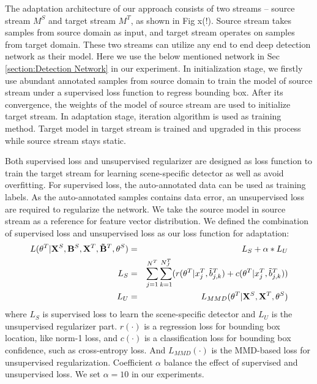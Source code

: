 \documentclass[runningheads]{llncs}
\begin{document}
The adaptation architecture of our approach consists of two streams -- source stream $M^{S}$ and target stream $M^{T}$, as shown in Fig x(!). Source stream takes samples from source domain as input, and target stream operates on samples from target domain. These two streams can utilize any end to end deep detection network as their model. Here we use the below mentioned network in Sec \ref{section:Detection Network} in our experiment. In initialization stage, we firstly use abundant annotated samples from source domain to train the model of source stream under a supervised loss function to regress bounding box. After its convergence, the weights of the model of source stream are used to initialize target stream. In adaptation stage, iteration algorithm is used as training method. Target model in target stream is trained and upgraded in this process while source stream stays static.

Both supervised loss and unsupervised regularizer are designed as loss function to train the target stream for learning scene-specific detector as well as avoid overfitting. For supervised loss, the auto-annotated data can be used as training labels. As the auto-annotated samples contains data error, an unsupervised loss are required to regularize the network. We take the source model in source stream as a reference for feature vector distribution. We defined the combination of supervised loss and unsupervised loss as our loss function for adaptation:
\begin{eqnarray}
  L(\theta^{T}|{\bf X}^{S},{\bf B}^{S},{\bf X}^{T},{\bf \tilde{B}}^{T},\theta^{S}) &=& L_{S} + \alpha * L_{U} \\
  L_{S} &=&  \sum^{N^{T}}_{j=1}{\sum^{N^{T}_{J}}_{k=1}( r(\theta^{T}|x^{T}_{j},\tilde{b}^{T}_{j,k})+c(\theta^{T}|x^{T}_{j},\tilde{b}^{T}_{j,k}) )} \\
  L_{U} &=& L_{MMD}(\theta^{T}|{\bf X}^{S},{\bf X}^{T},\theta^{S}) \label{Eq:lmmd}
\end{eqnarray}
where $L_{S}$ is supervised loss to learn the scene-specific detector and $L_{U}$ is the unsupervised regularizer part. $r(\cdot)$ is a regression loss for bounding box location, like norm-1 loss, and $c(\cdot)$ is a classification loss for bounding box confidence, such as cross-entropy loss. And $L_{MMD}(\cdot)$ is the MMD-based loss for unsupervised regularization. Coefficient $\alpha$ balance the effect of supervised and unsupervised loss. We set $\alpha = 10$ in our experiments.
\end{document}
